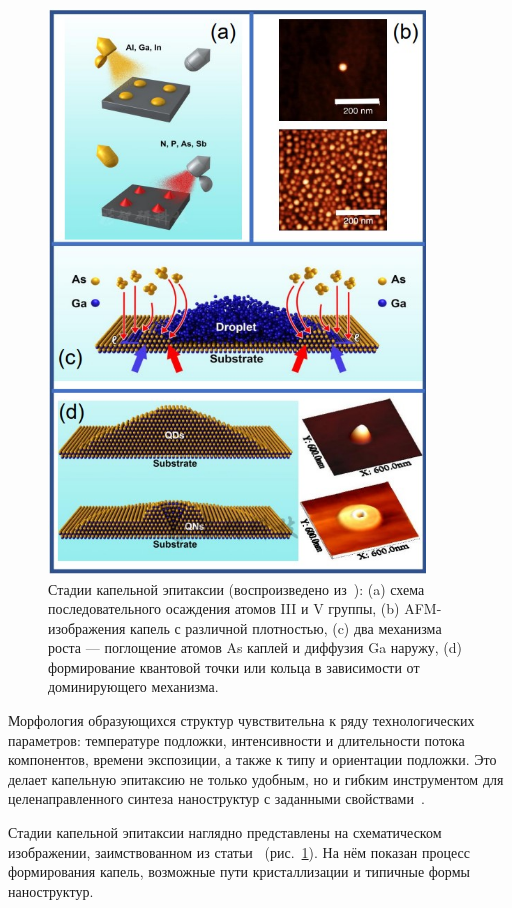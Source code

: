 \documentclass[14pt,oneside]{extarticle}
\begin{document}
\begin{figure}[H]
    \begin{center}
        \includegraphics[width=10cm]{images/gurioli_fig1.png}
        \caption{\label{fig:gurioli1}
            Стадии капельной эпитаксии (воспроизведено из~\cite{gurioli2021}): (a) схема последовательного осаждения атомов III и V группы, (b) AFM-изображения капель с различной плотностью, (c) два механизма роста — поглощение атомов As каплей и диффузия Ga наружу, (d) формирование квантовой точки или кольца в зависимости от доминирующего механизма.}
    \end{center}
\end{figure}

Морфология образующихся структур чувствительна к ряду технологических параметров: температуре подложки, интенсивности и длительности потока компонентов, времени экспозиции, а также к типу и ориентации подложки. Это делает капельную эпитаксию не только удобным, но и гибким инструментом для целенаправленного синтеза наноструктур с заданными свойствами~\cite{sibirmovskiy2014}.

Стадии капельной эпитаксии наглядно представлены на схематическом изображении, заимствованном из статьи~\cite{gurioli2021} (рис.~\ref{fig:gurioli1}). На нём показан процесс формирования капель, возможные пути кристаллизации и типичные формы наноструктур.
\end{document}
